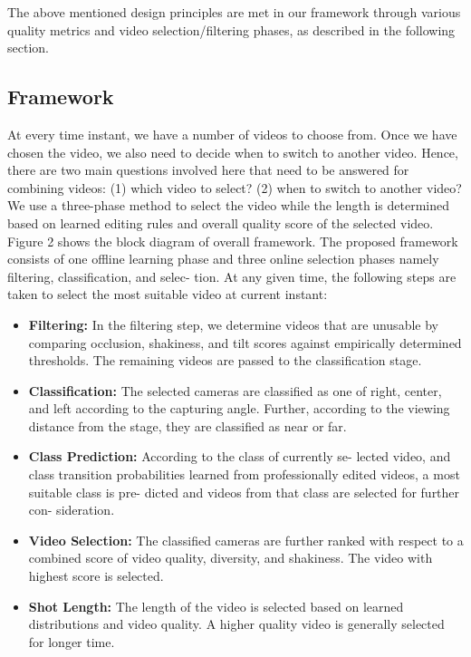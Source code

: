 \documentclass{sig-alternate}
\begin{document}
The above mentioned design principles are met in our framework
through various quality metrics and video selection/filtering phases,
as described in the following section.

\subsection{Framework}

At every time instant, we have a number of videos to choose
from. Once we have chosen the video, we also need to decide when
to switch to another video. Hence, there are two main questions
involved here that need to be answered for combining videos: (1)
which video to select? (2) when to switch to another video? We
use a three-phase method to select the video while the length is
determined based on learned editing rules and overall quality score
of the selected video.
Figure 2 shows the block diagram of overall framework. The
proposed framework consists of one offline learning phase and three
online selection phases namely filtering, classification, and selec-
tion. At any given time, the following steps are taken to select the
most suitable video at current instant:
\begin{itemize}
    \item \textbf{Filtering:} In the filtering step, we determine videos that are
unusable by comparing occlusion, shakiness, and tilt scores
against empirically determined thresholds. The remaining
videos are passed to the classification stage.
    \item \textbf{Classification:} The selected cameras are classified as one
of right, center, and left according to the capturing angle.
Further, according to the viewing distance from the stage,
they are classified as near or far.
    \item \textbf{Class Prediction:} According to the class of currently se-
lected video, and class transition probabilities learned from
professionally edited videos, a most suitable class is pre-
dicted and videos from that class are selected for further con-
sideration.
    \item \textbf{Video Selection:} The classified cameras are further ranked
with respect to a combined score of video quality, diversity,
and shakiness. The video with highest score is selected.
    \item \textbf{Shot Length:} The length of the video is selected based on
learned distributions and video quality. A higher quality video
is generally selected for longer time.
\end{itemize}
\end{document}
